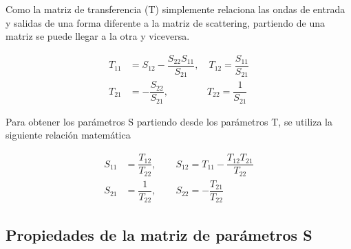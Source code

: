 Como la matriz de transferencia (T) simplemente relaciona las ondas de entrada y salidas de una forma diferente a la matriz de 
scattering, partiendo de una matriz se puede llegar a la otra y viceversa.

\begin{equation}
	\begin{aligned}
		T_{11} &= S_{12} - \dfrac{S_{22}S_{11}}{S_{21}},\quad T_{12} = \dfrac{S_{11}}{S_{21}} \\
		T_{21} &= - \dfrac{S_{22}}{S_{21}},\qquad\qquad T_{22} = \dfrac{1}{S_{21}}
	\end{aligned}
\end{equation}

Para obtener los parámetros S partiendo desde los parámetros T, se utiliza la siguiente relación matemática

\begin{equation}
	\begin{aligned}
		S_{11} &= \dfrac{T_{12}}{T_{22}},\qquad S_{12} = T_{11} - \dfrac{T_{12}T_{21}}{T_{22}} \\
		S_{21} &= \dfrac{1}{T_{22}},\qquad S_{22} = - \dfrac{T_{21}}{T_{22}}
	\end{aligned}
\end{equation}


\subsection{Propiedades de la matriz de parámetros S}

